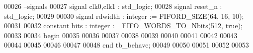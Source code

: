 \begin{DoxyCode}
00026 \textcolor{keyword}{   --signals}
00027    \textcolor{keywordflow}{signal} \textcolor{vhdlchar}{clk0}\textcolor{vhdlchar}{,}\textcolor{vhdlchar}{clk1}        \textcolor{vhdlchar}{:} \textcolor{comment}{std\_logic};
00028    \textcolor{keywordflow}{signal} \textcolor{vhdlchar}{reset_n}          \textcolor{vhdlchar}{:} \textcolor{comment}{std\_logic}; 
00029    
00030    \textcolor{keywordflow}{signal} \textcolor{vhdlchar}{rdwidth}          \textcolor{vhdlchar}{:} \textcolor{comment}{integer} \textcolor{vhdlchar}{:=} \textcolor{vhdlchar}{FIFORD\_SIZE}\textcolor{vhdlchar}{(}\textcolor{vhdllogic}{}\textcolor{vhdllogic}{64}\textcolor{vhdlchar}{,} \textcolor{vhdllogic}{}\textcolor{vhdllogic}{16}\textcolor{vhdlchar}{,} \textcolor{vhdllogic}{}\textcolor{vhdllogic}{10}\textcolor{vhdlchar}{)};
00031    
00032    \textcolor{keywordflow}{constant} \textcolor{vhdlchar}{bits}           \textcolor{vhdlchar}{:} \textcolor{comment}{integer} \textcolor{vhdlchar}{:=} \textcolor{vhdlchar}{FIFO\_WORDS\_TO\_Nbits}\textcolor{vhdlchar}{(}\textcolor{vhdllogic}{}\textcolor{vhdllogic}{512}\textcolor{vhdlchar}{,} \textcolor{vhdlchar}{true}\textcolor{vhdlchar}{)};
00033    
00034 \textcolor{vhdlkeyword}{begin }
00035    
00036   
00037 
00038    
00039    
00040    
00041    
00042 
00043    
00044 
00045    
00046 
00047 
00048 \textcolor{keywordflow}{end} \textcolor{vhdlchar}{tb\_behave};
00049   
00050   
00051 
00052 
00053   
\end{DoxyCode}
